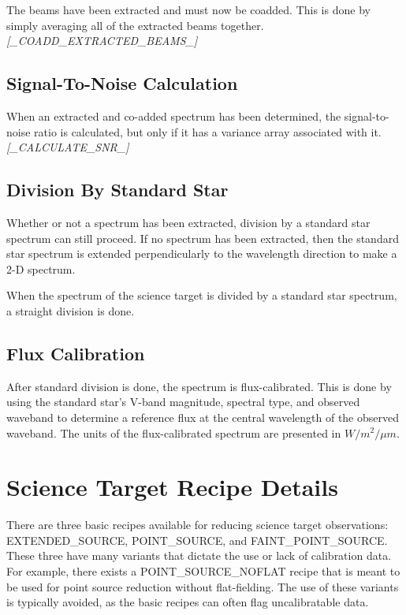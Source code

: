 \documentclass[twoside,11pt,nolof]{starlink}
\begin{document}
The beams have been extracted and must now be coadded. This is done
by simply averaging all of the extracted beams together.
\newline \emph{[\_COADD\_EXTRACTED\_BEAMS\_]}

\subsection{Signal-To-Noise Calculation\label{snr_calculation}}

When an extracted and co-added spectrum has been determined, the
signal-to-noise ratio is calculated, but only if it has a variance
array associated with it.
\newline \emph{[\_CALCULATE\_SNR\_]}

\subsection{Division By Standard Star\label{division_by_standard}}

Whether or not a spectrum has been extracted, division by a standard star
spectrum can still proceed. If no spectrum has been extracted, then the
standard star spectrum is extended perpendicularly to the wavelength direction
to make a 2-D spectrum.

When the spectrum of the science target is divided by a standard star spectrum, a straight division is done.

\subsection{Flux Calibration\label{flux_calibration}}

After standard division is done, the spectrum is flux-calibrated. This is
done by using the standard star's V-band magnitude, spectral type, and
observed waveband to determine a reference flux at the central wavelength
of the observed waveband. The units of the flux-calibrated spectrum are
presented in $W/m^{2}/{\mu}m$.

\section{Science Target Recipe Details\label{science_target_recipe_details}}

There are three basic recipes available for reducing science target observations: EXTENDED\_SOURCE, POINT\_SOURCE, and FAINT\_POINT\_SOURCE. These three have many variants that dictate the use or lack of calibration data. For example, there exists a POINT\_SOURCE\_NOFLAT recipe that is meant to be used for point source reduction without flat-fielding. The use of these variants is typically avoided, as the basic recipes can often flag uncalibratable data.
\end{document}

